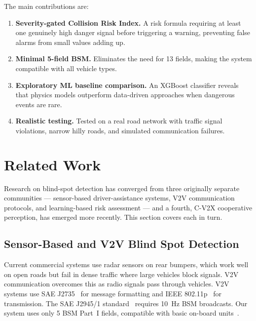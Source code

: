 \documentclass[sn-mathphys-num,Numbered,iicol]{sn-jnl}
\begin{document}
The main contributions are:
\begin{enumerate}
  \item \textbf{Severity-gated Collision Risk Index.} A risk formula requiring at least one genuinely high danger signal before triggering a warning, preventing false alarms from small values adding up.
  \item \textbf{Minimal 5-field BSM.} Eliminates the need for 13 fields, making the system compatible with all vehicle types.
  \item \textbf{Exploratory ML baseline comparison.} An XGBoost classifier reveals that physics models outperform data-\allowbreak driven approaches when dangerous events are rare.
  \item \textbf{Realistic testing.} Tested on a real road network with traffic signal violations, narrow hilly roads, and simulated communication failures.
\end{enumerate}

\section{Related Work}\label{sec:related}

Research on blind-spot detection has converged from three originally separate communities --- sensor-based driver-assistance systems, V2V communication protocols, and learning-based risk assessment --- and a fourth, C-V2X cooperative perception, has emerged more recently. This section covers each in turn.

\subsection{Sensor-Based and V2V Blind Spot Detection}
Current commercial systems use radar sensors on rear bumpers, which work well on open roads but fail in dense traffic where large vehicles block signals. V2V communication overcomes this as radio signals pass through vehicles. V2V systems use SAE J2735~\cite{sae_j2735} for message formatting and IEEE 802.11p~\cite{ieee_80211p} for transmission. The SAE J2945/1 standard~\cite{sae_j2945} requires 10~Hz BSM broadcasts. Our system uses only 5 BSM Part~I fields, compatible with basic on-board units~\cite{festag2014}.
\end{document}
